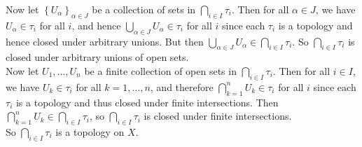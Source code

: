 \documentclass[a4paper]{article}
\begin{document}
    Now let $\left\{ U_{\alpha} \right\}_{\alpha \in J}$ be a collection of
    sets in $\bigcap_{i \in  I} \tau_i$. Then 
    for all $\alpha \in J$, we have $U_{\alpha} \in \tau_i$ for all $i$, and
    hence $\bigcup_{\alpha \in J} U_{\alpha} \in \tau_i$ for all $i$ since
    each $\tau_i$ is a topology and hence closed under arbitrary unions. But
    then
    $\bigcup_{\alpha \in J} U_{\alpha} \in \bigcap_{i \in  I} \tau_i$.
    So $\bigcap_{i \in I} \tau_i$ is closed under arbitrary unions of open
    sets.\\
    \linebreak
    Now let $U_1, \ldots, U_n$ be a finite collection of open sets in
    $\bigcap_{i \in  I} \tau_i$.
    Then for all $i \in I$, we have $U_k \in \tau_i$ for all $k = 1,\ldots ,n$,
    and therefore
    $\bigcap_{k=1}^{n}U_k \in \tau_i$ for all $i$ since each $\tau_i$ is
    a topology and thus closed under finite intersections. Then
    $\bigcap_{k=1}^{n} U_k \in \bigcap_{i \in  I} \tau_i$, so $\bigcap_{i \in
    I} \tau_i$ is closed under finite intersections.\\
    So $\bigcap_{i \in  I} \tau_i$ is a topology on $X$.
















    
\end{document}

